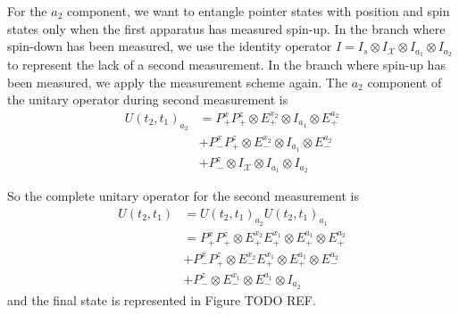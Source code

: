 For the $a_2$ component, we want to entangle pointer states with position and spin states only when the first apparatus has measured spin-up. In the branch where spin-down has been measured, we use the identity operator $I = I_s \otimes I_\mathcal{X} \otimes I_{a_1} \otimes I_{a_2}$ to represent the lack of a second measurement. In the branch where spin-up has been measured, we apply the measurement scheme again. The $a_2$ component of the unitary operator during second measurement is
\begin{align}
  U(t_2, t_1)_{a_2} &= P^x_+ P^z_+ \otimes E^{x_2}_+ \otimes I_{a_1} \otimes E^{a_2}_+ \\ \nonumber
  &+ P^x_- P^z_+ \otimes E^{x_2}_- \otimes I_{a_1} \otimes E^{a_2}_- \\ \nonumber
  &+ P^z_- \otimes{I_\mathcal{X}} \otimes I_{a_1} \otimes I_{a_2}
\end{align}

So the complete unitary operator for the second measurement is
\begin{align}
  U(t_2, t_1) &= U(t_2, t_1)_{a_2} U(t_2, t_1)_{a_1} \\ \nonumber
  &= P^x_+ P^z_+ \otimes E^{x_2}_+  E^{x_1}_+ \otimes E^{a_1}_+ \otimes E^{a_2}_+ \\ \nonumber
  &+ P^x_- P^z_+ \otimes E^{x_2}_-  E^{x_1}_+ \otimes E^{a_1}_+ \otimes E^{a_2}_- \\ \nonumber
  &+ P^z_- \otimes E^{x_1}_- \otimes E^{a_1}_- \otimes I_{a_2}
\end{align}
and the final state is represented in Figure TODO REF.

